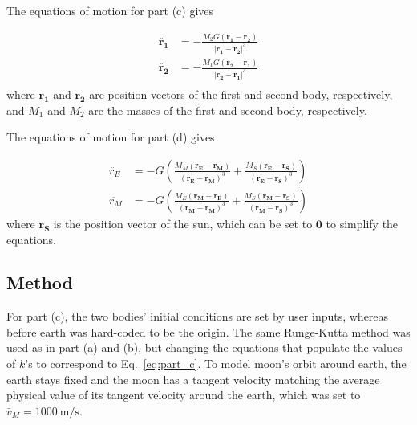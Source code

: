 \documentclass[hyphens,twocolumn,nobalancelastpage,aps,10pt,citeautoscript,longbibliography]{revtex4-2}
\begin{document}
\noindent The equations of motion for part (c) gives

\begin{equation}
	\label{eq:part_c}%
	\begin{split}
		\ddot{\mathbf{r_1}} &= -\frac{M_2G\left(\mathbf{r_1} - \mathbf{r_2}\right)}{{\left|\mathbf{r_1} - \mathbf{r_2}\right|}^3} \\
		\ddot{\mathbf{r_2}} &= -\frac{M_1G\left(\mathbf{r_2} - \mathbf{r_1}\right)}{{\left|\mathbf{r_2} - \mathbf{r_1}\right|}^3} \\
	\end{split}
\end{equation}
where $\mathbf{r_1}$ and $\mathbf{r_2}$ are position vectors of the first and
second body, respectively, and $M_1$ and $M_2$ are the masses of the first and
second body, respectively.

The equations of motion for part (d) gives

\begin{equation}
    \label{eq:part_d}%
    \begin{split}
        \ddot{r_E} &= -G\left(\frac{M_M\left(\mathbf{r_E} - \mathbf{r_M}\right)}{{\left(\mathbf{r_E} - \mathbf{r_M}\right)}^3} + \frac{M_S\left(\mathbf{r_E} - \mathbf{r_S}\right)}{{\left(\mathbf{r_E} - \mathbf{r_S}\right)}^3}\right)\\
        \ddot{r_M} &= -G\left(\frac{M_E\left(\mathbf{r_M} - \mathbf{r_E}\right)}{{\left(\mathbf{r_M} - \mathbf{r_M}\right)}^3} + \frac{M_S\left(\mathbf{r_M} - \mathbf{r_S}\right)}{{\left(\mathbf{r_M} - \mathbf{r_S}\right)}^3}\right)
    \end{split}
\end{equation}
where $\mathbf{r_S}$ is the position vector of the sun, which can be set to
$\mathbf{0}$ to simplify the equations.

\subsection{Method}%
\label{sub:method_2}

\noindent For part (c), the two bodies' initial conditions are set by user
inputs, whereas before earth was hard-coded to be the origin. The same
Runge-Kutta method was used as in part (a) and (b), but changing the equations
that populate the values of $k$'s to correspond to Eq.~\ref{eq:part_c}. To
model moon's orbit around earth, the earth stays fixed and the moon has a
tangent velocity matching the average physical value of its tangent velocity
around the earth, which was set to $\bar{v}_M = \qty{1000}{\metre\per\second}$.
\end{document}

